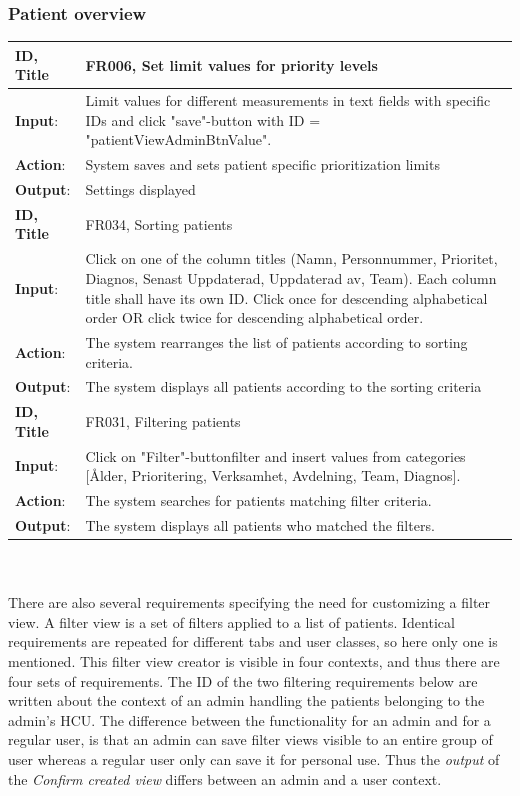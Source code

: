 \documentclass{article}
\begin{document}
\subsubsection{Patient overview}

\begin{tabularx}{\linewidth}{| l |  X |}
\hline
\textbf{ID, Title} & FR006, Set limit values for priority levels  \\ 
\hline
\textbf{Input}: & Limit values for different measurements in text fields with specific IDs and click "save"-button with ID = "patientViewAdminBtnValue".\\
\textbf{Action}: & System saves and sets patient specific prioritization limits \\
\textbf{Output}: & Settings displayed \\
\hline

\textbf{ID, Title} & FR034, Sorting patients  \\ 
\hline
\textbf{Input}: & Click on one of the column titles (Namn, Personnummer, Prioritet, Diagnos, Senast Uppdaterad, Uppdaterad av, Team). Each column title shall have its own ID. Click once for descending alphabetical order OR click twice for descending alphabetical order.  \\
\textbf{Action}: & The system rearranges the list of patients according to sorting criteria. \\
\textbf{Output}: & The system displays all patients according to the sorting criteria\\ 
\hline

 \textbf{ID, Title} & FR031, Filtering patients  \\ 
 \hline
 \textbf{Input}: &  Click on "Filter"-buttonfilter and insert values from categories [Ålder, Prioritering, Verksamhet, Avdelning, Team, Diagnos]. \\
\textbf{Action}: & The system searches for patients matching filter criteria. \\
\textbf{Output}: & The system displays all patients who matched the filters.\\
\hline
\end{tabularx}
\\ \\
There are also several requirements specifying the need for customizing a filter view. A filter view is a set of filters applied to a list of patients. Identical requirements are repeated for different tabs and user classes, so here only one is mentioned. This filter view creator is visible in four contexts, and thus there are four sets of requirements. The ID of the two filtering requirements below are written about the context of an admin handling the patients belonging to the admin's HCU. The difference between the functionality for an admin and for a regular user, is that an admin can save filter views visible to an entire group of user whereas a regular user only can save it for personal use. Thus the \emph{output} of the \emph{Confirm created view} differs between an admin and a user context.
\end{document}

